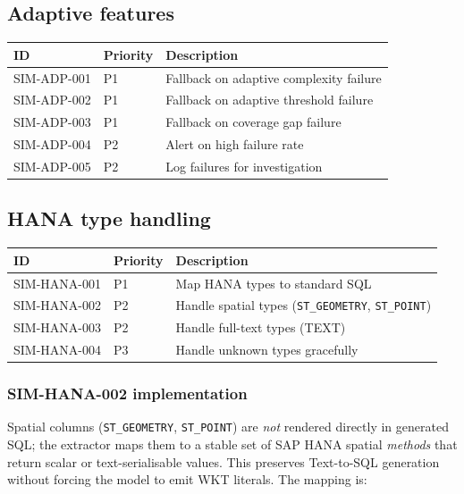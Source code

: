 \subsection{Adaptive features}

\begin{tabularx}{\linewidth}{@{}l l X@{}}
\toprule
\textbf{ID} & \textbf{Priority} & \textbf{Description} \\ \midrule
SIM-ADP-001 & P1 & Fallback on adaptive complexity failure \\
SIM-ADP-002 & P1 & Fallback on adaptive threshold failure \\
SIM-ADP-003 & P1 & Fallback on coverage gap failure \\
SIM-ADP-004 & P2 & Alert on high failure rate \\
SIM-ADP-005 & P2 & Log failures for investigation \\
\bottomrule
\end{tabularx}

\subsection{HANA type handling}

\begin{tabularx}{\linewidth}{@{}l l X@{}}
\toprule
\textbf{ID} & \textbf{Priority} & \textbf{Description} \\ \midrule
SIM-HANA-001 & P1 & Map HANA types to standard SQL \\
SIM-HANA-002 & P2 & Handle spatial types (\texttt{ST\_GEOMETRY}, \texttt{ST\_POINT}) \\
SIM-HANA-003 & P2 & Handle full-text types (TEXT) \\
SIM-HANA-004 & P3 & Handle unknown types gracefully \\
\bottomrule
\end{tabularx}

\subsubsection{SIM-HANA-002 implementation}

Spatial columns (\texttt{ST\_GEOMETRY}, \texttt{ST\_POINT}) are \emph{not}
rendered directly in generated SQL; the extractor maps them to a stable set
of SAP HANA spatial \emph{methods} that return scalar or text-serialisable
values. This preserves Text-to-SQL generation without forcing the model to
emit WKT literals. The mapping is:

